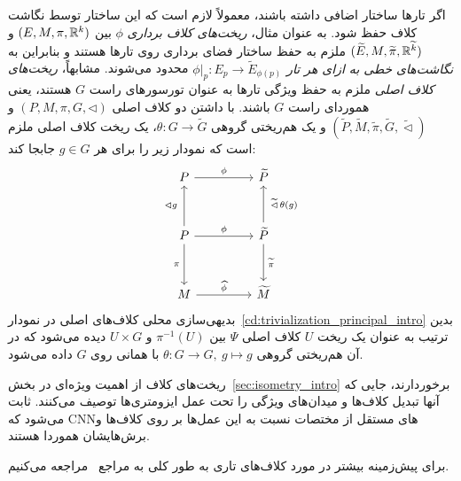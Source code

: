 اگر تارها ساختار اضافی داشته باشند، معمولاً لازم است که این ساختار توسط نگاشت کلاف حفظ شود.
به عنوان مثال، \emph{ریخت‌های کلاف برداری} $\phi$ بین $(E,M,\pi,\mathbb{R}^k)$ و $(\widetilde{E},M,\widetilde{\pi},\mathbb{R}^{\widetilde{k}})$ ملزم به حفظ ساختار فضای برداری روی تارها هستند و بنابراین به \emph{نگاشت‌های خطی به ازای هر تار $\phi|_p: E_p \to \widetilde{E}_{\phi(p)}$} محدود می‌شوند.
مشابهاً، \emph{ریخت‌های کلاف اصلی} ملزم به حفظ ویژگی تارها به عنوان تورسورهای راست $G$ هستند، یعنی هموردای راست $G$ باشند.
با داشتن دو کلاف اصلی $(P,M,\pi,G,\lhd)$ و $(\widetilde{P},\widetilde{M},\widetilde{\pi},\widetilde{G},\widetilde{\lhd})$ و یک هم‌ریختی گروهی $\theta:G \to \widetilde{G}$، یک ریخت کلاف اصلی ملزم است که نمودار زیر را برای هر $g\in G$ جابجا کند:
\begin{equation}\label{cd:principal_bundle_morphism}
\begin{tikzcd}[row sep=3.em, column sep=4.5em]
	P
			\arrow[r, "\phi"]
	& \widetilde{P}
	\\
	P
			\arrow[d, "\pi\,"']
			\arrow[r, "\phi"]
			\arrow[u, "\lhd g\ "]
	& \widetilde{P}
			\arrow[d, "\,\widetilde{\pi}"]
			\arrow[u, "\ \widetilde{\lhd}\, \theta(g)"']
	\\
	M
			\arrow[r, "\widehat{\phi}"]
	& \widetilde{M}
\end{tikzcd}
\end{equation}
بدیهی‌سازی محلی کلاف‌های اصلی در نمودار~\eqref{cd:trivialization_principal_intro} بدین ترتیب به عنوان یک ریخت $U$ کلاف اصلی $\Psi$ بین $\pi^{-1}(U)$ و $U \times G$ دیده می‌شود که در آن هم‌ریختی گروهی $\theta: G\to G,\ g\mapsto g$ با همانی روی $G$ داده می‌شود.

ریخت‌های کلاف از اهمیت ویژه‌ای در بخش~\ref{sec:isometry_intro} برخوردارند، جایی که آنها تبدیل کلاف‌ها و میدان‌های ویژگی را تحت عمل ایزومتری‌ها توصیف می‌کنند.
ثابت می‌شود که CNNهای مستقل از مختصات نسبت به این عمل‌ها بر روی کلاف‌ها و برش‌هایشان هموردا هستند.

برای پیش‌زمینه بیشتر در مورد کلاف‌های تاری به طور کلی به مراجع~\cite{schullerGeometricalAnatomy2016,nakahara2003geometry,husemollerFibreBundles1994a,steenrodTopologyFibreBundles,shoshichikobayashiFoundationsDifferentialGeometry1963,marshGaugeTheoriesFiber2016,wendlLectureNotesBundles2008} مراجعه می‌کنیم.